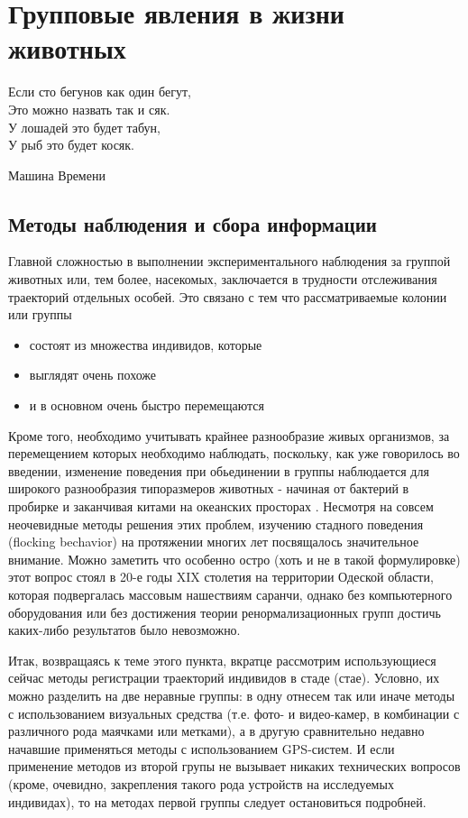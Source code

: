 \section{Групповые явления в жизни животных} %
\label{sec:AnimalFlocking}
\epigraph{Если сто бегунов как один бегут,\\
Это можно назвать так и сяк.\\
У лошадей это будет табун,\\
У рыб это будет косяк.}{Машина Времени}
	\subsection{Методы наблюдения и сбора информации} %
	\label{sub:ExperimentalMethods}
	Главной сложностью в выполнении экспериментального наблюдения за группой животных или, тем более, насекомых, заключается в трудности отслеживания траекторий отдельных особей. Это связано с тем что рассматриваемые колонии или группы
	\begin{itemize}
		\item  состоят из множества индивидов, которые
		\item выглядят очень похоже
		\item и в основном очень быстро перемещаются
	\end{itemize}
	Кроме того, необходимо учитывать крайнее разнообразие живых организмов, за перемещением которых необходимо наблюдать, поскольку, как уже говорилось во введении, изменение поведения при обьединении в группы наблюдается для широкого разнообразия типоразмеров животных - начиная от бактерий в пробирке \cite{csahok1997,keller1971} и заканчивая китами на океанских просторах \cite{makris2009}.
	Несмотря на совсем неочевидные методы решения этих проблем, изучению стадного поведения (flocking bechavior) на протяжении многих лет посвящалось значительное внимание. Можно заметить что особенно остро (хоть и не в такой формулировке) этот вопрос стоял в 20-е годы XIX столетия на территории Одеской области, которая подвергалась массовым нашествиям саранчи, однако без компьютерного оборудования или без достижения теории ренормализационных групп достичь каких-либо результатов было невозможно.

	Итак, возвращаясь к теме этого пункта, вкратце рассмотрим использующиеся сейчас методы регистрации траекторий индивидов в стаде (стае). Условно, их можно разделить на две неравные группы: в одну отнесем так или иначе методы с использованием визуальных средства (т.е. фото- и видео-камер, в комбинации с различного рода маячками или метками), а в другую сравнительно недавно начавшие применяться методы с использованием GPS-систем. И если применение методов из второй групы не вызывает никаких технических вопросов (кроме, очевидно, закрепления такого рода устройств на исследуемых индивидах), то на методах первой группы следует остановиться подробней.

